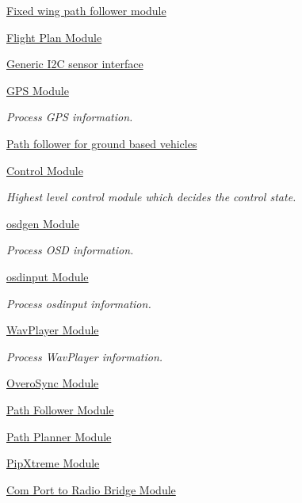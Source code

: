 \begin{DoxyCompactItemize}
\hyperlink{group___fixed_wing_path_follower}{\-Fixed wing path follower module}
\item 
\hyperlink{group___flight_plan}{\-Flight Plan Module}
\item 
\hyperlink{group___generic_i2_c_sensor}{\-Generic I2\-C sensor interface}
\item 
\hyperlink{group___g_s_p_module}{\-G\-P\-S Module}
\begin{DoxyCompactList}\small\item\em \-Process \-G\-P\-S information. \end{DoxyCompactList}\item 
\hyperlink{group___ground_path_follower}{\-Path follower for ground based vehicles}
\item 
\hyperlink{group___control}{\-Control Module}
\begin{DoxyCompactList}\small\item\em \-Highest level control module which decides the control state. \end{DoxyCompactList}\item 
\hyperlink{group___o_s_d_g_e_n_module}{osdgen Module}
\begin{DoxyCompactList}\small\item\em \-Process \-O\-S\-D information. \end{DoxyCompactList}\item 
\hyperlink{group__osdinput_module}{osdinput Module}
\begin{DoxyCompactList}\small\item\em \-Process osdinput information. \end{DoxyCompactList}\item 
\hyperlink{group___wav_player_module}{\-Wav\-Player Module}
\begin{DoxyCompactList}\small\item\em \-Process \-Wav\-Player information. \end{DoxyCompactList}\item 
\hyperlink{group___overo_sync_module}{\-Overo\-Sync Module}
\item 
\hyperlink{group___path_follower_module}{\-Path Follower Module}
\item 
\hyperlink{group___path_planner_module}{\-Path Planner Module}
\item 
\hyperlink{group___pip_xtreme_module}{\-Pip\-Xtreme Module}
\item 
\hyperlink{group___radio_com_bridge_module}{\-Com Port to Radio Bridge Module}
\item 

\end{DoxyCompactItemize}
